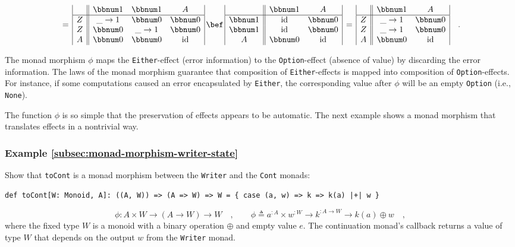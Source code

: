 \begin{align*}
 & \quad=\,\begin{array}{|c||ccc|}
 & \bbnum 1 & \bbnum 1 & A\\
\hline Z & \_\rightarrow1 & \bbnum 0 & \bbnum 0\\
Z & \bbnum 0 & \_\rightarrow1 & \bbnum 0\\
A & \bbnum 0 & \bbnum 0 & \text{id}
\end{array}\,\bef\,\begin{array}{|c||cc|}
 & \bbnum 1 & A\\
\hline \bbnum 1 & \text{id} & \bbnum 0\\
\bbnum 1 & \text{id} & \bbnum 0\\
A & \bbnum 0 & \text{id}
\end{array}\,=\,\begin{array}{|c||cc|}
 & \bbnum 1 & A\\
\hline Z & \_\rightarrow1 & \bbnum 0\\
Z & \_\rightarrow1 & \bbnum 0\\
A & \bbnum 0 & \text{id}
\end{array}\quad.
\end{align*}

The monad morphism $\phi$ maps the \lstinline!Either!-effect (error
information) to the \lstinline!Option!-effect (absence of value)
by discarding the error information. The laws of the monad morphism
guarantee that composition of \lstinline!Either!-effects is mapped
into composition of \lstinline!Option!-effects. For instance, if
some computations caused an error encapsulated by \lstinline!Either!,
the corresponding value after $\phi$ will be an empty \lstinline!Option!
(i.e., \lstinline!None!). 

The function $\phi$ is so simple that the preservation of effects
appears to be automatic. The next example shows a monad morphism that
translates effects in a nontrivial way.

\subsubsection{Example \label{subsec:monad-morphism-writer-state}\ref{subsec:monad-morphism-writer-state}}

Show that \lstinline!toCont! is a monad morphism between the \lstinline!Writer!
and the \lstinline!Cont! monads:
\begin{lstlisting}
def toCont[W: Monoid, A]: ((A, W)) => (A => W) => W = { case (a, w) => k => k(a) |+| w }
\end{lstlisting}
\[
\phi:A\times W\rightarrow\left(A\rightarrow W\right)\rightarrow W\quad,\quad\quad\phi\triangleq a^{:A}\times w^{:W}\rightarrow k^{:A\rightarrow W}\rightarrow k\left(a\right)\oplus w\quad,
\]
where the fixed type $W$ is a monoid with a binary operation $\oplus$
and empty value $e$. The continuation monad\textsf{'}s callback returns a
value of type $W$ that depends on the output $w$ from the \lstinline!Writer!
monad.

